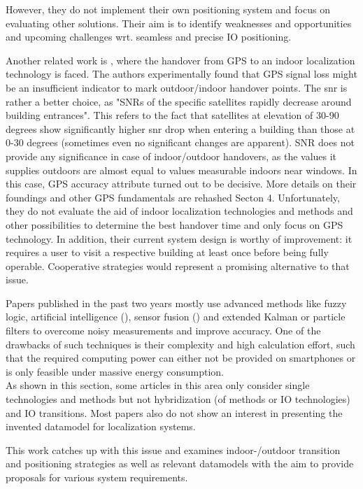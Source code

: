 However, they do not implement their own positioning system and focus on evaluating other solutions. Their aim is to identify weaknesses and opportunities and upcoming challenges wrt. seamless and precise IO positioning.


Another related work is \cite{seamlessGPShandoverStrategy}, where the handover from GPS to an indoor localization technology is faced. The authors experimentally found that GPS signal loss might be an insufficient indicator to mark outdoor/indoor handover points. The \ac{snr} is rather a better choice, as "SNRs of the specific satellites rapidly decrease around building entrances". This refers to the fact that satellites at elevation of 30-90 degrees show significantly higher \ac{snr} drop when entering a building than those at 0-30 degrees (sometimes even no significant changes are apparent).
SNR does not provide any significance in case of indoor/outdoor handovers, as the values it supplies outdoors are almost equal to values measurable indoors near windows. In this case, GPS accuracy attribute turned out to be decisive. 
More details on their foundings and other GPS fundamentals are rehashed Secton 4.
Unfortunately, they do not evaluate the aid of indoor localization technologies and methods and other possibilities to determine the best handover time and only focus on GPS technology. In addition, their current system design is worthy of improvement: it requires a user to visit a respective building at least once before being fully operable. Cooperative strategies would represent a promising alternative to that issue.

Papers published in the past two years mostly use advanced methods like fuzzy logic, artificial intelligence (\cite{ai1}), sensor fusion (\cite{sensorFusion1}) and extended Kalman or particle filters to overcome noisy measurements and improve accuracy. One of the drawbacks of such techniques is their complexity and high calculation effort, such that the required computing power can either not be provided on smartphones or is only feasible under massive energy consumption.\\




As shown in this section, some articles in this area only consider single technologies and methods but not hybridization (of methods or IO technologies) and IO transitions.
Most papers also do not show an interest in presenting the invented datamodel for localization systems.

This work catches up with this issue and examines indoor-/outdoor transition and positioning strategies as well as relevant datamodels with the aim to provide proposals for various system requirements.\\


